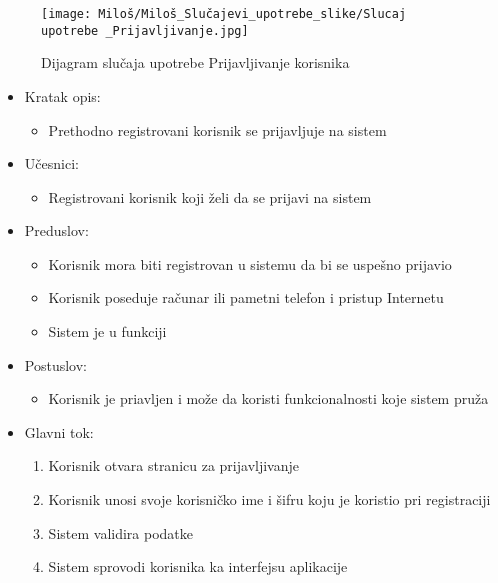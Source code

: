 \documentclass[a4paper]{article}
\begin{document}
\begin{figure}[htp]
    \centering
    \texttt{[image: Miloš/Miloš\_Slučajevi\_upotrebe\_slike/Slucaj upotrebe \_Prijavljivanje.jpg]}
    \caption{Dijagram slučaja upotrebe Prijavljivanje korisnika}
    \label{fig:Prijavljivanje}
\end{figure}

\begin{itemize}
    \item Kratak opis:
        \begin{itemize}
            \item Prethodno registrovani korisnik se prijavljuje na sistem
        \end{itemize}
    \item Učesnici:
        \begin{itemize}
            \item Registrovani korisnik koji želi da se prijavi na sistem
        \end{itemize}
    \item Preduslov:
        \begin{itemize}
            \item Korisnik mora biti registrovan u sistemu da bi se uspešno prijavio
            \item Korisnik poseduje računar ili pametni telefon i pristup Internetu
            \item Sistem je u funkciji
        \end{itemize}
    \item Postuslov:
        \begin{itemize}
            \item Korisnik je priavljen i može da koristi funkcionalnosti koje sistem pruža
        \end{itemize}
    \item Glavni tok:
        \begin{enumerate}
            \item Korisnik otvara stranicu za prijavljivanje
            \item Korisnik unosi svoje korisničko ime i šifru koju je koristio pri registraciji
            \item Sistem validira podatke
            \item Sistem sprovodi korisnika ka interfejsu aplikacije

\end{enumerate}
\end{itemize}
\end{document}
